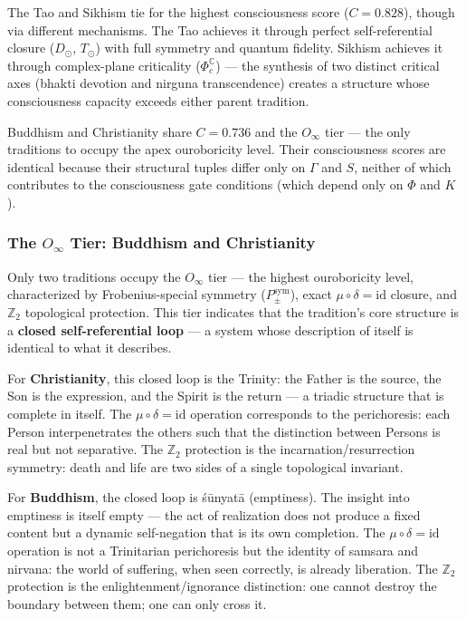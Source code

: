 \documentclass[12pt,a4paper]{article}
\begin{document}
The Tao and Sikhism tie for the highest consciousness score ($C = 0.828$), though via different mechanisms. The Tao achieves it through perfect self-referential closure ($D_{\odot}$, $T_{\odot}$) with full symmetry and quantum fidelity. Sikhism achieves it through complex-plane criticality ($\Phi_c^\mathbb{C}$) --- the synthesis of two distinct critical axes (bhakti devotion and nirguna transcendence) creates a structure whose consciousness capacity exceeds either parent tradition.

Buddhism and Christianity share $C = 0.736$ and the $O_{\infty}$ tier --- the only traditions to occupy the apex ouroboricity level. Their consciousness scores are identical because their structural tuples differ only on $\Gamma$ and $S$, neither of which contributes to the consciousness gate conditions (which depend only on $\Phi$ and $K$).

\subsubsection{The $O_{\infty}$ Tier: Buddhism and Christianity}

Only two traditions occupy the $O_{\infty}$ tier --- the highest ouroboricity level, characterized by Frobenius-special symmetry ($P_{\pm}^{\text{sym}}$), exact $\mu\circ\delta = \text{id}$ closure, and $\mathbb{Z}_2$ topological protection. This tier indicates that the tradition's core structure is a \textbf{closed self-referential loop} --- a system whose description of itself is identical to what it describes.

For \textbf{Christianity}, this closed loop is the Trinity: the Father is the source, the Son is the expression, and the Spirit is the return --- a triadic structure that is complete in itself. The $\mu\circ\delta = \text{id}$ operation corresponds to the perichoresis: each Person interpenetrates the others such that the distinction between Persons is real but not separative. The $\mathbb{Z}_2$ protection is the incarnation/resurrection symmetry: death and life are two sides of a single topological invariant.

For \textbf{Buddhism}, the closed loop is śūnyatā (emptiness). The insight into emptiness is itself empty --- the act of realization does not produce a fixed content but a dynamic self-negation that is its own completion. The $\mu\circ\delta = \text{id}$ operation is not a Trinitarian perichoresis but the identity of samsara and nirvana: the world of suffering, when seen correctly, is already liberation. The $\mathbb{Z}_2$ protection is the enlightenment/ignorance distinction: one cannot destroy the boundary between them; one can only cross it.
\end{document}
